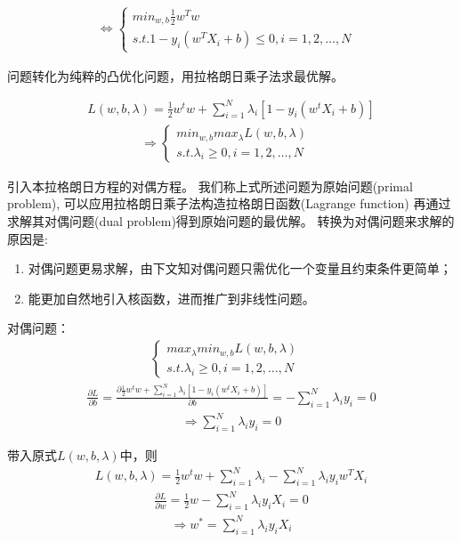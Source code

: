 \documentclass[12pt]{article}
\begin{document}
\begin{align}
	\Leftrightarrow \left\{
	\begin{array}{lr}
	min_{w,b} \frac{1}{2}w^Tw &  \\
	s.t. 1-y_i(w^TX_i+b)\leq  0,i=1,2,\ldots ,N &  
	\end{array}
	\right.
\end{align}

问题转化为纯粹的凸优化问题，用拉格朗日乘子法求最优解。

\begin{align}
	L(w,b,\lambda)=\frac{1}{2}w^tw+\sum_{i=1}^N\lambda_i\left[1-y_i(w^tX_i+b)\right] 
\end{align}
\begin{align}
	\Rightarrow \left\{
	\begin{array}{lr}
	min_{w,b} max_\lambda L(w,b,\lambda) &  \\
	s.t. \lambda_i\geq   0,i=1,2,\ldots ,N &  
	\end{array}
	\right.
\end{align}

引入本拉格朗日方程的对偶方程。
我们称上式所述问题为原始问题(primal problem), 
可以应用拉格朗日乘子法构造拉格朗日函数(Lagrange function)
再通过求解其对偶问题(dual problem)得到原始问题的最优解。
转换为对偶问题来求解的原因是:
\begin{enumerate}
	\item 对偶问题更易求解，由下文知对偶问题只需优化一个变量且约束条件更简单；
	\item 能更加自然地引入核函数，进而推广到非线性问题。
\end{enumerate}

对偶问题：
\begin{align}
	\left\{
	\begin{array}{lr}
	max_\lambda min_{w,b}  L(w,b,\lambda) &  \\
	s.t. \lambda_i\geq   0,i=1,2,\ldots ,N &  
	\end{array}
	\right.
\end{align}
\begin{align}
	\frac{\partial L}{\partial b}
	=\frac{\partial \frac{1}{2}w^tw+\sum_{i=1}^N\lambda_i\left[1-y_i(w^tX_i+b)\right]}{\partial b}
    =-\sum_{i=1}^N \lambda_iy_i=0
\end{align}
\begin{align}
	\Rightarrow \sum_{i=1}^N \lambda_iy_i=0
\end{align}

带入原式$L(w,b,\lambda)$中，则
\begin{align}
	L(w,b,\lambda)=\frac{1}{2}w^tw+\sum_{i=1}^N\lambda_i-\sum_{i=1}^N\lambda_iy_iw^TX_i
\end{align}
\begin{align}
	\frac{\partial L}{\partial w}
	=\frac{1}{2}w-\sum_{i=1}^N\lambda_iy_iX_i=0
\end{align}
\begin{align}
	\Rightarrow w^\ast =\sum_{i=1}^N\lambda_iy_iX_i
\end{align}
\end{document}
